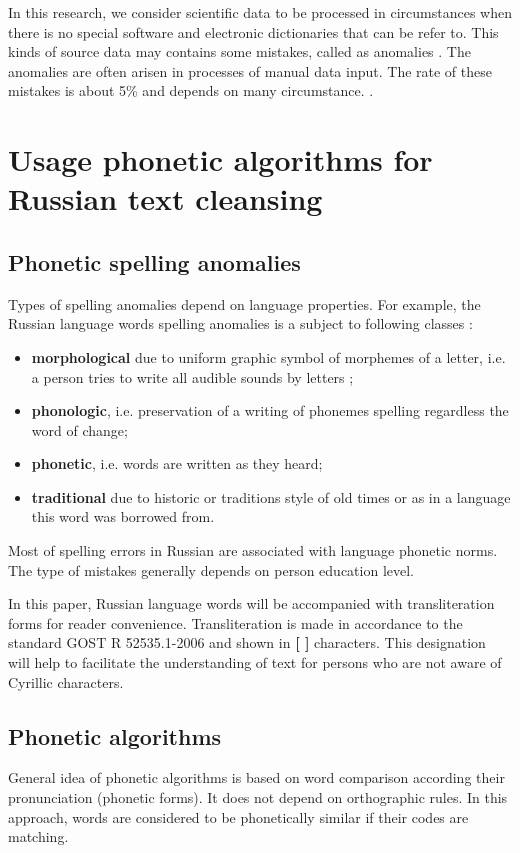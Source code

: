 \documentclass{svproc}
\begin{document}
In this research, we consider scientific data to be processed in circumstances when there is no special software and electronic dictionaries that can be refer to. This kinds of source data may contains some mistakes, called as anomalies \cite{Orr-1998}. The anomalies are often arisen in processes of manual data input. The rate of these mistakes is about 5\% and depends on many circumstance. \cite{Orr-1998}.


\section{Usage phonetic algorithms for Russian text cleansing}
\subsection{Phonetic spelling anomalies}
Types of spelling anomalies depend on language properties. For example, the Russian language words spelling anomalies is a subject to following classes \cite{Skripnik-2010}:
\begin{itemize}
\item \textbf{morphological} due to uniform graphic symbol of morphemes of a letter, i.e. a person tries to write all audible sounds by letters \cite{Valgina-2002};
\item \textbf{phonologic}, i.e. preservation of a writing of phonemes spelling regardless the word of change;
\item \textbf{phonetic}, i.e. words are written as they heard;
\item \textbf{traditional} due to historic or traditions style of old times or as in a language this word was borrowed from.
\end{itemize}

Most of spelling errors in Russian are associated with language phonetic norms. The type of mistakes generally depends on person education level\cite{Parubchenko-2005}.

In this paper, Russian language words will be accompanied with transliteration forms for reader convenience. Transliteration is made in accordance to the standard GOST R 52535.1-2006 \cite{GOST-2006} and shown in \textbf{[ ]} characters. This designation will help to facilitate the understanding of text for persons who are not aware of Cyrillic characters.

\subsection{Phonetic algorithms}
General idea of phonetic algorithms is based on word comparison according their pronunciation (phonetic forms). It does not depend on orthographic rules. In this approach, words are considered to be phonetically similar if their codes are matching.
\end{document}

